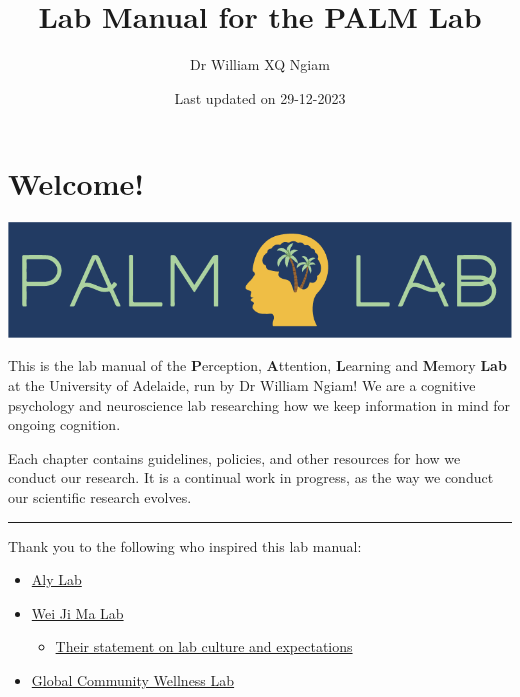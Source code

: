 \documentclass[
]{book}
\title{Lab Manual for the PALM Lab}
\author{Dr William XQ Ngiam}
\date{Last updated on 29-12-2023}
\providecommand{\tightlist}{%
  \setlength{\itemsep}{0pt}\setlength{\parskip}{0pt}}
\begin{document}
\maketitle

{
\setcounter{tocdepth}{1}
\tableofcontents
}
\hypertarget{welcome}{%
\chapter*{Welcome!}\label{welcome}}

\includegraphics{images/banner.png}

This is the lab manual of the \textbf{P}erception, \textbf{A}ttention, \textbf{L}earning and \textbf{M}emory \textbf{Lab} at the University of Adelaide, run by Dr William Ngiam! We are a cognitive psychology and neuroscience lab researching how we keep information in mind for ongoing cognition.

Each chapter contains guidelines, policies, and other resources for how we conduct our research. It is a continual work in progress, as the way we conduct our scientific research evolves.

\begin{center}\rule{0.5\linewidth}{0.5pt}\end{center}

Thank you to the following who inspired this lab manual:

\begin{itemize}
\tightlist
\item
  \href{https://github.com/alylab/labmanual/blob/master/aly-lab-manual.pdf}{Aly Lab}
\item
  \href{https://www.cns.nyu.edu/malab/lablife.html}{Wei Ji Ma Lab}

  \begin{itemize}
  \tightlist
  \item
    \href{https://docs.google.com/document/d/1f6foaCkHiCkPKjO0gdKkkdm2dn1EKn5xRKZv-Ut5Dg4/edit?usp=sharing}{Their statement on lab culture and expectations}
  \end{itemize}
\item
  \href{https://bookdown.org/jordandanielsnyder/LabManual/expectations-and-responsiblities.html}{Global Community Wellness Lab}
\end{itemize}
\end{document}
